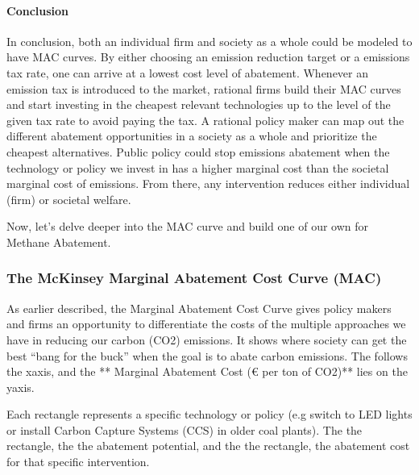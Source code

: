 \documentclass[letterpaper,10pt,english]{jupyterBook}
\begin{document}
\paragraph{Conclusion}
\label{\detokenize{content/12-environmental/textbook1:conclusion}}
\sphinxAtStartPar
In conclusion, both an individual firm and society as a whole could be modeled to have MAC curves. By either choosing an emission reduction target or a emissions tax rate, one can arrive at a lowest cost level of abatement. Whenever an emission tax is introduced to the market, rational firms build their MAC curves and start investing in the cheapest relevant technologies up to the level of the given tax rate to avoid paying the tax. A rational policy maker can map out the different abatement opportunities in a society as a whole and prioritize the cheapest alternatives. Public policy could stop emissions abatement when the technology or policy we invest in has a higher marginal cost than the societal marginal cost of emissions. From there, any intervention reduces either individual (firm) or societal welfare.

\sphinxAtStartPar
Now, let’s delve deeper into the  MAC curve and build one of our own for Methane Abatement.


\subsubsection{The McKinsey Marginal Abatement Cost Curve (MAC)}
\label{\detokenize{content/12-environmental/textbook1:the-mckinsey-marginal-abatement-cost-curve-mac}}
\sphinxAtStartPar
As earlier described, the Marginal Abatement Cost Curve gives policy makers and firms an opportunity to differentiate the costs of the multiple approaches we have in reducing our carbon (CO2) emissions. It shows where society can get the best “bang for the buck” when the goal is to abate carbon emissions. The  follows the x\sphinxhyphen{}axis, and the ** Marginal Abatement Cost (€ per ton of CO2)** lies on the y\sphinxhyphen{}axis.

\sphinxAtStartPar
Each rectangle represents a specific technology or policy (e.g switch to LED lights or install Carbon Capture Systems (CCS) in older coal plants). The  the rectangle, the  the abatement potential, and the  the rectangle, the  abatement cost for that specific intervention.
\end{document}
